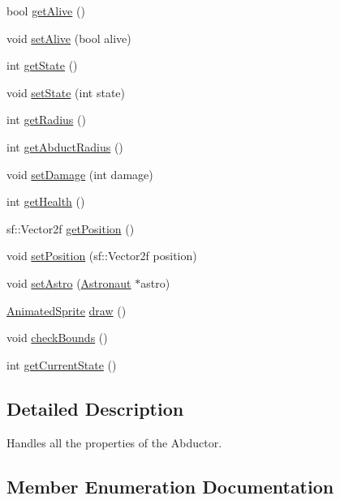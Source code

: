 \begin{DoxyCompactItemize}
\item 
bool \hyperlink{class_alien_a6da0e947ec0c70d429e54511d67ad608}{get\+Alive} ()
\item 
void \hyperlink{class_alien_a1f8e8072e38c88e7299867ce08e169f4}{set\+Alive} (bool alive)
\item 
int \hyperlink{class_alien_a4954611d3a021f57a02564f17a3b0efc}{get\+State} ()
\item 
void \hyperlink{class_alien_aead215fe05108897f31e12c9e58b0d90}{set\+State} (int state)
\item 
int \hyperlink{class_alien_ab649dc3a1c86463c29b32931683685ab}{get\+Radius} ()
\item 
int \hyperlink{class_alien_a9dbe59b6c7ec7ad946e113f0f05f7427}{get\+Abduct\+Radius} ()
\item 
void \hyperlink{class_alien_a5f1364d7d592e43230971365bb58d5a3}{set\+Damage} (int damage)
\item 
int \hyperlink{class_alien_aa83dd26e21c40429865e3f84018545a0}{get\+Health} ()
\item 
sf\+::\+Vector2f \hyperlink{class_alien_a52dc07105cf8ff2a25961ecebf9fbbe1}{get\+Position} ()
\item 
void \hyperlink{class_alien_a751c54dcc0d77d92c6540b05b0fef50a}{set\+Position} (sf\+::\+Vector2f position)
\item 
void \hyperlink{class_alien_a23b7f6d84b71e233834a36ee37e90b14}{set\+Astro} (\hyperlink{class_astronaut}{Astronaut} $\ast$astro)
\item 
\hyperlink{class_animated_sprite}{Animated\+Sprite} \hyperlink{class_alien_a518e51803e638c46d0452ba283f2aad6}{draw} ()
\item 
void \hyperlink{class_alien_a1f94914265a34170958fbf0cc4dbf187}{check\+Bounds} ()
\item 
int \hyperlink{class_alien_a3165f3c2c824c3784dd0054d48fd5c5a}{get\+Current\+State} ()
\end{DoxyCompactItemize}


\subsection{Detailed Description}
Handles all the properties of the Abductor. 



\subsection{Member Enumeration Documentation}
\mbox{\label{class_alien_a46333b42b6e6dff962c3236b7012ec8c}} 
